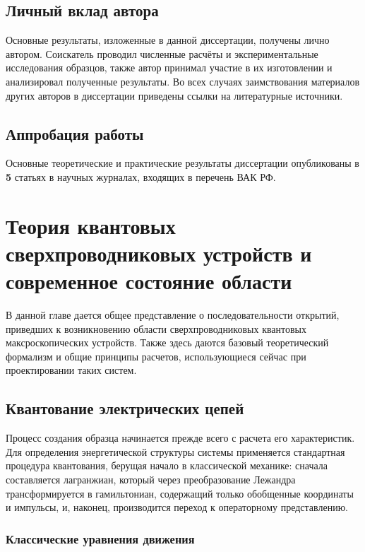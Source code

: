 \documentclass[14pt, a4paper]{extreport}
\numberwithin{equation}{section}
\begin{document}
\section*{Личный вклад автора}

Основные результаты, изложенные в данной диссертации, получены лично автором. Соискатель проводил численные расчёты и экспериментальные исследования образцов, также автор принимал участие в
их изготовлении и анализировал полученные результаты. Во всех случаях
заимствования материалов других авторов в диссертации приведены ссылки
на литературные источники.

\section*{Аппробация работы}

Основные теоретические и практические результаты диссертации
опубликованы в \textbf{5} статьях в научных журналах, входящих в перечень ВАК
РФ.


\chapter{Теория квантовых сверхпроводниковых устройств и современное состояние области}

В данной главе дается общее представление о последовательности открытий, приведших к возникновению области сверхпроводниковых квантовых максроскопических устройств. Также здесь даются базовый теоретический формализм и общие принципы расчетов, использующиеся сейчас при проектировании таких систем. 

\section{Квантование электрических цепей}\label{sec:circuit_quantization}


Процесс создания образца начинается прежде всего с расчета его характеристик. Для определения энергетической структуры системы применяется стандартная процедура квантования, берущая начало в классической механике: сначала составляется лагранжиан, который через преобразование Лежандра трансформируется в гамильтониан, содержащий только обобщенные координаты и импульсы, и, наконец, производится переход к операторному представлению. 

\subsection{Классические уравнения движения}
\end{document}
